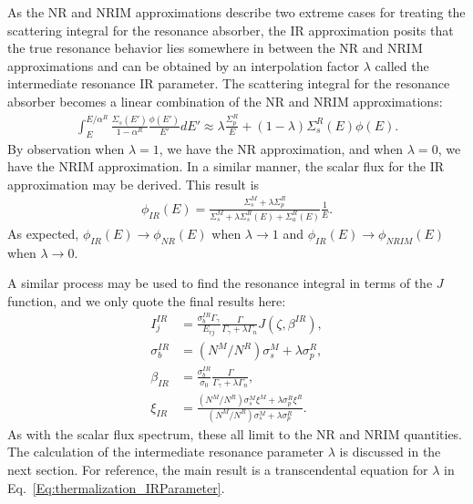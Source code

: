 As the NR and NRIM approximations describe two extreme cases for treating the scattering integral for the resonance absorber, the IR approximation posits that the true resonance behavior lies somewhere in between the NR and NRIM approximations and can be obtained by an interpolation factor $\lambda$ called the intermediate resonance IR parameter. The scattering integral for the resonance absorber becomes a linear combination of the NR and NRIM approximations:
\begin{align}
  \int_E^{E/\alpha^R} \frac{\Sigma_s(E')}{1 - \alpha^R} \frac{\phi(E')}{E'} dE' 
  \approx \lambda \frac{\Sigma_p^R}{E} + (1 - \lambda) \Sigma_s^R(E) \phi(E).
\end{align}
By observation when $\lambda = 1$, we have the NR approximation, and when $\lambda = 0$, we have the NRIM approximation. In a similar manner, the scalar flux for the IR approximation may be derived. This result is
\begin{align} 
  \phi_{IR}(E) = \frac{ \Sigma_s^M + \lambda \Sigma_p^R }{ \Sigma_s^M +  \lambda \Sigma_s^R(E) + \Sigma_a^R(E) } \frac{1}{E} . \label{Eq:thermalization_IR_FluxSpectrum}
\end{align}
As expected, $\phi_{IR}(E) \rightarrow \phi_{NR}(E)$ when $\lambda \rightarrow 1$ and $\phi_{IR}(E) \rightarrow \phi_{NRIM}(E)$ when $\lambda \rightarrow 0$. 

A similar process may be used to find the resonance integral in terms of the $J$ function, and we only quote the final results here:
\begin{subequations} \label{Eq:thermalization_ResonanceIntegral_IR}
\begin{align}
  I_j^{IR} 		&= \frac{ \sigma_b^{IR} \Gamma_\gamma }{ E_{rj} } \frac{\Gamma}{\Gamma_\gamma + \lambda \Gamma_n } J(\zeta,\beta^{IR} ) , \\
  \sigma_b^{IR} &= (N^M/N^R) \sigma_s^M + \lambda \sigma_p^R,  \\
  \beta_{IR} 	&= \frac{ \sigma_b^{IR} }{ \sigma_0 } \frac{\Gamma}{\Gamma_\gamma + \lambda \Gamma_n } , \\
  \xi_{IR}   	&= \frac{ (N^M/N^R) \sigma_s^M \xi^M + \lambda \sigma_p^R \xi^R }{ (N^M/N^R) \sigma_s^M + \lambda \sigma_p^R } .
\end{align}
\end{subequations}
As with the scalar flux spectrum, these all limit to the NR and NRIM quantities. The calculation of the intermediate resonance parameter $\lambda$ is discussed in the next section. For reference, the main result is a transcendental equation for $\lambda$ in Eq.~\eqref{Eq:thermalization_IRParameter}.

